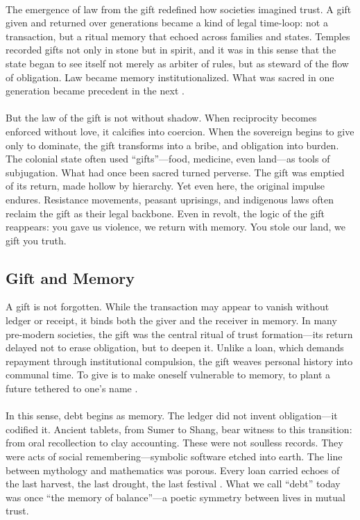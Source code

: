 \documentclass[12pt]{article}
\begin{document}
\paragraph{} The emergence of law from the gift redefined how societies imagined trust. A gift given and returned over generations became a kind of legal time-loop: not a transaction, but a ritual memory that echoed across families and states. Temples recorded gifts not only in stone but in spirit, and it was in this sense that the state began to see itself not merely as arbiter of rules, but as steward of the flow of obligation. Law became memory institutionalized. What was sacred in one generation became precedent in the next \parencite{weiner1992inalienable}.

\paragraph{} But the law of the gift is not without shadow. When reciprocity becomes enforced without love, it calcifies into coercion. When the sovereign begins to give only to dominate, the gift transforms into a bribe, and obligation into burden. The colonial state often used ``gifts''—food, medicine, even land—as tools of subjugation. What had once been sacred turned perverse. The gift was emptied of its return, made hollow by hierarchy. Yet even here, the original impulse endures. Resistance movements, peasant uprisings, and indigenous laws often reclaim the gift as their legal backbone. Even in revolt, the logic of the gift reappears: you gave us violence, we return with memory. You stole our land, we gift you truth.

\subsection{Gift and Memory}

A gift is not forgotten. While the transaction may appear to vanish without ledger or receipt, it binds both the giver and the receiver in memory. In many pre-modern societies, the gift was the central ritual of trust formation—its return delayed not to erase obligation, but to deepen it. Unlike a loan, which demands repayment through institutional compulsion, the gift weaves personal history into communal time. To give is to make oneself vulnerable to memory, to plant a future tethered to one’s name \parencite{hyde2019gift,sahlins1972stone}.

\paragraph{} In this sense, debt begins as memory. The ledger did not invent obligation—it codified it. Ancient tablets, from Sumer to Shang, bear witness to this transition: from oral recollection to clay accounting. These were not soulless records. They were acts of social remembering—symbolic software etched into earth. The line between mythology and mathematics was porous. Every loan carried echoes of the last harvest, the last drought, the last festival \parencite{graeber2011debt}. What we call “debt” today was once “the memory of balance”—a poetic symmetry between lives in mutual trust.
\end{document}
